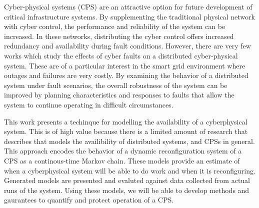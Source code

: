 Cyber-physical systems (CPS) are an attractive option for future development of
critical infrastructure systems. By supplementing the traditional physical
network with cyber control, the performance and reliability of the system
can be increased. In these networks, distributing the cyber control
offers increased redundancy and availability during fault conditions. However,
there are very few works which study the effects of cyber faults on a 
distributed cyber-physical system. These are of a particular interest in the smart grid
environment where outages and failures are very costly. By examining the
behavior of a distributed system under fault scenarios, the overall robustness
of the system can be improved by planning characteristics and responses to
faults that allow the system to continue operating in difficult circumstances.

This work presents a techinque for modelling the availability of a cyberphysical
system. This is of high value because there is a limited
amount of research that describes that models the availibility of distributed systems,
and CPSs in general. This approach encodes the behavior of a dynamic reconfiguration 
system of a CPS as a continous-time Markov chain.
These models provide an estimate of when a cyberphysical system will be able to do work
and when it is reconfiguring. Generated models are presented and evaluted against data
collected from actual runs of the system. Using these models, we will be able to develop
methods and gaurantees to quantify and protect operation of a CPS.
